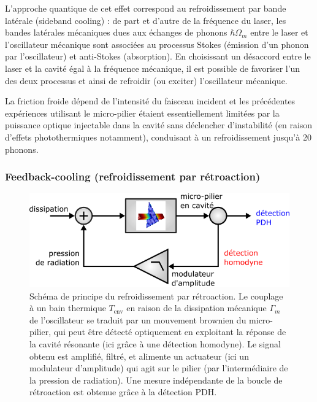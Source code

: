 \documentclass[12pt,a4paper]{article}
\begin{document}
L'approche quantique de cet effet correspond au refroidissement par bande latérale (sideband cooling) : de part et d'autre de la fréquence du laser, les bandes latérales mécaniques dues aux échanges de phonons $\hbar\Omega_m$ entre le laser et l'oscillateur mécanique sont associées au processus Stokes (émission d'un phonon par l'oscillateur) et anti-Stokes (absorption).
En choisissant un désaccord entre le laser et la cavité égal à la fréquence mécanique, il est possible de favoriser l'un des deux processus et ainsi de refroidir (ou exciter) l'oscillateur mécanique. 

La friction froide dépend de l'intensité du faisceau incident et les précédentes expériences utilisant le micro-pilier étaient essentiellement limitées par la puissance optique injectable dans la cavité sans déclencher d'instabilité (en raison d'effets photothermiques notamment), conduisant à un refroidissement jusqu'à 20 phonons.

\subsubsection{Feedback-cooling (refroidissement par rétroaction)}

\begin{figure}
\center
\includegraphics[scale=0.5]{figures/feedback_cooling.png}
\caption{Schéma de principe du refroidissement par rétroaction.
Le couplage à un bain thermique $T_\mathrm{env}$ en raison de la dissipation mécanique $\Gamma_m$ de l'oscillateur se traduit par un mouvement brownien du micro-pilier, qui peut être détecté optiquement en exploitant la réponse de la cavité résonante (ici grâce à une détection homodyne).
Le signal obtenu est amplifié, filtré, et alimente un actuateur (ici un modulateur d'amplitude) qui agit sur le pilier (par l'intermédiaire de la pression de radiation).
Une mesure indépendante de la boucle de rétroaction est obtenue grâce à la détection PDH.}
\label{fig:feedback_scheme}
\end{figure}
\end{document}
